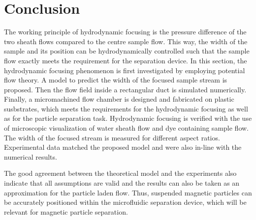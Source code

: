 \section{Conclusion}\label{sec:conclusionFluidMechanics}
The working principle of hydrodynamic focusing is the pressure difference of the two sheath flows compared to the centre sample flow. This way, the width of the sample and its position can be hydrodynamically controlled such that the sample flow exactly meets the requirement for the separation device. In this section, the hydrodynamic focusing phenomenon is first investigated by employing potential flow theory. A model to predict the width of the focused sample stream is proposed. Then the flow field inside a rectangular duct is simulated numerically. Finally, a micromachined flow chamber is designed and fabricated on plastic susbstrates, which meets the requirements for the hydrodynamic focusing as well as for the particle separation task. Hydrodynamic focusing is verified with the use of microscopic visualization of water sheath flow and dye containing sample flow. The width of the focused stream is measured for different aspect ratios. Experimental data matched the proposed model and were also in-line with the numerical results. 

The good agreement between the theoretical model and the experiments also indicate that all assumptions are valid and the results can also be taken as an approximation for the particle laden flow. Thus, suspended magnetic particles can be accurately positioned within the microfluidic separation device, which will be relevant for magnetic particle separation. 